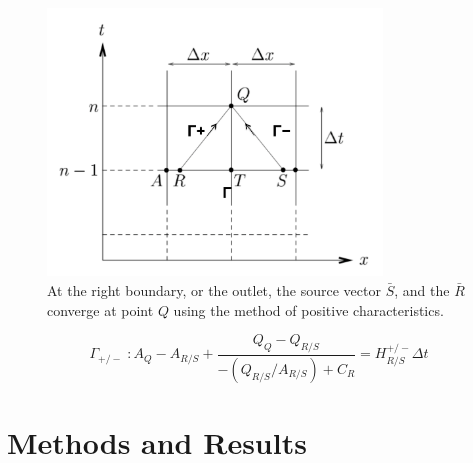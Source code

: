 \documentclass[12pt]{article}
\newcommand{\tensor}[1]{\bar{#1}}
\begin{document}
\begin{figure}[ht]
	\centering
	\label{characteristicplot}
	\includegraphics[width=3.5in]{characterplot}
	\caption{At the right boundary, or the outlet, the source vector $\tensor{S}$, and the $\tensor{R}$ converge at point $Q$ using the method of positive characteristics.~\cite{olufsenthesis}}
\end{figure}

 \begin{equation}
 	\label{characteristics}
 	\Gamma_{+/-}\; : A_Q - A_{R/S} + \frac{Q_Q - Q_{R/S}}{-(Q_{R/S}/A_{R/S}) + C_R} = H_{R/S}^{+/-} \Delta t
\end{equation}

\section{Methods and Results}
\end{document}
